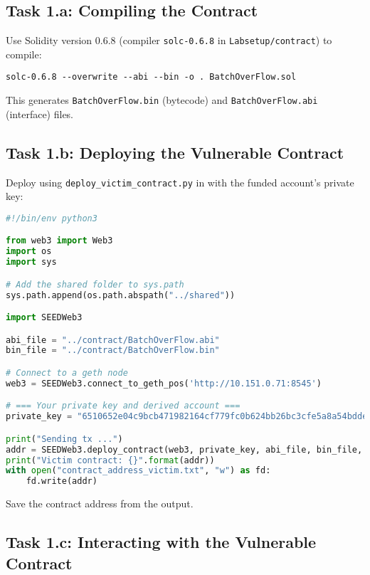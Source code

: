 \subsection{Task 1.a: Compiling the Contract}

Use Solidity version 0.6.8 (compiler \texttt{solc-0.6.8} in \texttt{Labsetup/contract}) to compile:

\begin{lstlisting}
solc-0.6.8 --overwrite --abi --bin -o . BatchOverFlow.sol
\end{lstlisting}

This generates \texttt{BatchOverFlow.bin} (bytecode) and \texttt{BatchOverFlow.abi} (interface) files.

\subsection{Task 1.b: Deploying the Vulnerable Contract}

Deploy using \texttt{deploy\_victim\_contract.py} in  with the funded account’s private key:

\begin{lstlisting}[language=python, caption={Deploying the contract (\texttt{deploy\_victim\_contract.py})}]
#!/bin/env python3

from web3 import Web3
import os
import sys

# Add the shared folder to sys.path
sys.path.append(os.path.abspath("../shared"))

import SEEDWeb3

abi_file = "../contract/BatchOverFlow.abi"
bin_file = "../contract/BatchOverFlow.bin"

# Connect to a geth node
web3 = SEEDWeb3.connect_to_geth_pos('http://10.151.0.71:8545')

# === Your private key and derived account ===
private_key = "6510652e04c9bcb471982164cf779fc0b624bb26bc3cfe5a8a54bddeba90d667"

print("Sending tx ...")
addr = SEEDWeb3.deploy_contract(web3, private_key, abi_file, bin_file, 0)
print("Victim contract: {}".format(addr))
with open("contract_address_victim.txt", "w") as fd:
    fd.write(addr)
\end{lstlisting}

Save the contract address from the output.

\subsection{Task 1.c: Interacting with the Vulnerable Contract}

